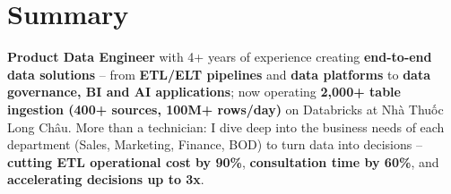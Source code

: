 
\section{Summary}
\textbf{Product Data Engineer} with 4+ years of experience creating \textbf{end-to-end data solutions} -- from \textbf{ETL/ELT pipelines} and \textbf{data platforms} to \textbf{data governance, BI and AI applications}; now operating \textbf{2{,}000+ table ingestion (400+ sources, 100M+ rows/day)} on Databricks at Nhà Thuốc Long Châu. More than a technician: I dive deep into the business needs of each department (Sales, Marketing, Finance, BOD) to turn data into decisions -- \textbf{cutting ETL operational cost by 90\%}, \textbf{consultation time by 60\%}, and \textbf{accelerating decisions up to 3x}.
